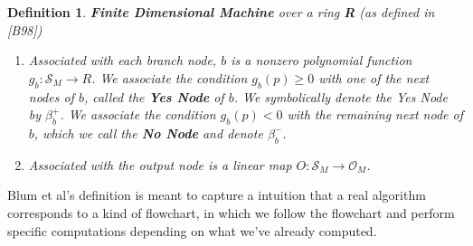 \documentclass[twoside]{article}
\newcommand{\outspace}[0]{\mathcal{O}}
\newcommand{\statespace}[0]{\mathcal{S}}
\newcommand{\functype}[3]{$#1:#2 \rightarrow #3$}
\renewcommand{\cite}[1]{[#1]}
\newtheorem{definition}[theorem]{Definition}
\begin{document}
\begin{definition}{\textbf{Finite Dimensional Machine} over a ring
    \textbf{R} (as defined in \cite{B98})}
\begin{enumerate}
  \item Associated with each branch node, $b$ is a nonzero polynomial
    function \functype{g_b}{\statespace_M}{R}.  We associate the
    condition $g_b(p) \geq 0$ with one of the next nodes of $b$,
    called the \textbf{Yes Node} of $b$.  We symbolically denote the Yes Node by $\beta_b^+$. We
    associate the condition $g_b(p) < 0$ with the remaining next node of $b$, which we call the 
    \textbf{No Node} and denote $\beta_b^-$. 

  \item Associated with the output node is a linear map
    \functype{O}{\statespace_M}{\outspace_M}.

  \end{enumerate}
\end{definition}

Blum et al's definition is meant to capture a intuition that a real
algorithm corresponds to a kind of flowchart, in which we follow the
flowchart and perform specific computations depending on what we've
already computed.  
\end{document}
